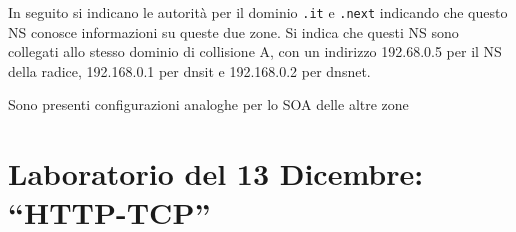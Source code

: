\documentclass{article}
\numberwithin{equation}{subsection}
\begin{document}
In seguito si indicano le autorità per il dominio \texttt{.it} e \texttt{.next} indicando che questo NS conosce informazioni su queste due zone. 
Si indica che questi NS sono collegati allo stesso dominio di collisione A, con un indirizzo 192.68.0.5 per il NS della radice, 192.168.0.1 per 
dnsit e 192.168.0.2 per dnsnet. 

Sono presenti configurazioni analoghe per lo SOA delle altre zone %

\clearpage

\section{Laboratorio del 13 Dicembre: ``HTTP-TCP''}

\end{document}
